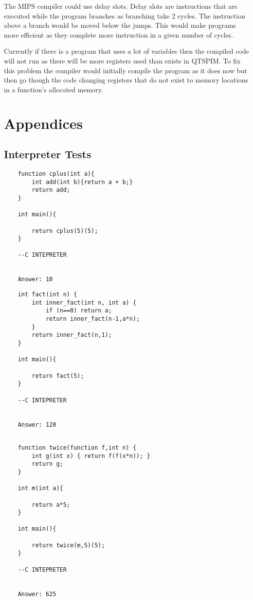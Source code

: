 \documentclass{article}
\begin{document}
	The MIPS compiler could use delay slots. Delay slots are instructions that are executed while the program branches as branching take 2 cycles. The instruction above a branch would be moved below the jumps. This would make programs more efficient as they complete more instruction in a given number of cycles.
	
	Currently if there is a program that uses a lot of variables then the compiled code will not run as there will be more registers used than exists in QTSPIM. To fix this problem the compiler would initially compile the program as it does now but then go though the code changing registers that do not exist to memory locations in a function's allocated memory.
	
	\section{Appendices}
	\subsection{Interpreter Tests}
	
	\begin{lstlisting}
	function cplus(int a){
		int add(int b){return a + b;}
		return add;
	}
	
	int main(){
		
		return cplus(5)(5);
	}
	
	--C INTEPRETER
	
	
	Answer: 10
	\end{lstlisting}
	
	\begin{lstlisting}
	int fact(int n) {
		int inner_fact(int n, int a) {
			if (n==0) return a;
			return inner_fact(n-1,a*n);
		}
		return inner_fact(n,1);
	}
	
	int main(){
		
		return fact(5);
	}
	
	--C INTEPRETER
	
	
	Answer: 120
	
	\end{lstlisting}
	
	\begin{lstlisting}
	function twice(function f,int n) {
		int g(int x) { return f(f(x*n)); }
		return g;
	}
	
	int m(int a){
		
		return a*5;
	}
	
	int main(){
		
		return twice(m,5)(5);
	}
	
	--C INTEPRETER
	
	
	Answer: 625
	\end{lstlisting}
	
\end{document}
